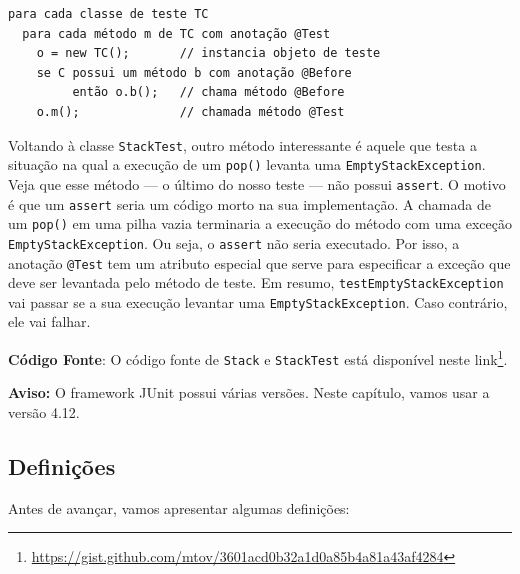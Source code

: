 \documentclass[
  11pt,
  twoside]{book}
\newcommand{\passthrough}[1]{#1}
\DeclareRobustCommand{\href}[2]{#2\footnote{\url{#1}}}
\newenvironment{aviso}{\centering \vspace{1.5ex} \begin{tcolorbox}[breakable, colback=backcolor, width=4.9in]}{\end{tcolorbox} \vspace{1.5ex}}
\begin{document}
\begin{lstlisting}
para cada classe de teste TC
  para cada método m de TC com anotação @Test
    o = new TC();       // instancia objeto de teste
    se C possui um método b com anotação @Before
         então o.b();   // chama método @Before
    o.m();              // chamada método @Test
\end{lstlisting}

Voltando à classe \passthrough{\lstinline!StackTest!}, outro método
interessante é aquele que testa a situação na qual a execução de um
\passthrough{\lstinline!pop()!} levanta uma
\passthrough{\lstinline!EmptyStackException!}. Veja que esse método ---
o último do nosso teste --- não possui \passthrough{\lstinline!assert!}.
O motivo é que um \passthrough{\lstinline!assert!} seria um código morto
na sua implementação. A chamada de um \passthrough{\lstinline!pop()!} em
uma pilha vazia terminaria a execução do método com uma exceção
\passthrough{\lstinline!EmptyStackException!}. Ou seja, o
\passthrough{\lstinline!assert!} não seria executado. Por isso, a
anotação \passthrough{\lstinline!@Test!} tem um atributo especial que
serve para especificar a exceção que deve ser levantada pelo método de
teste. Em resumo, \passthrough{\lstinline!testEmptyStackException!} vai
passar se a sua execução levantar uma
\passthrough{\lstinline!EmptyStackException!}. Caso contrário, ele vai
falhar.

\textbf{Código Fonte}: O código fonte de \passthrough{\lstinline!Stack!}
e \passthrough{\lstinline!StackTest!} está disponível neste
\href{https://gist.github.com/mtov/3601acd0b32a1d0a85b4a81a43af4284}{link}.

\begin{aviso}

\textbf{Aviso:} O framework JUnit possui várias versões. Neste capítulo,
vamos usar a versão 4.12.

\end{aviso}

\hypertarget{definiuxe7uxf5es}{%
\subsection{Definições}\label{definiuxe7uxf5es}}


Antes de avançar, vamos apresentar algumas definições:
\end{document}
